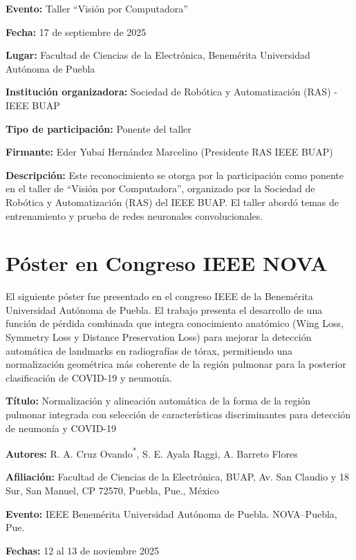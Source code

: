 \textbf{Evento:} Taller ``Visión por Computadora''

\textbf{Fecha:} 17 de septiembre de 2025

\textbf{Lugar:} Facultad de Ciencias de la Electrónica, Benemérita Universidad Autónoma de Puebla

\textbf{Institución organizadora:} Sociedad de Robótica y Automatización (RAS) - IEEE BUAP

\textbf{Tipo de participación:} Ponente del taller

\textbf{Firmante:} Eder Yubaí Hernández Marcelino (Presidente RAS IEEE BUAP)

\textbf{Descripción:} Este reconocimiento se otorga por la participación como ponente en el taller de ``Visión por Computadora'', organizado por la Sociedad de Robótica y Automatización (RAS) del IEEE BUAP. El taller abordó temas de entrenamiento y prueba de redes neuronales convolucionales.



\section{Póster en Congreso IEEE NOVA}

El siguiente póster fue presentado en el congreso IEEE de la Benemérita Universidad Autónoma de Puebla. El trabajo presenta el desarrollo de una función de pérdida combinada que integra conocimiento anatómico (Wing Loss, Symmetry Loss y Distance Preservation Loss) para mejorar la detección automática de landmarks en radiografías de tórax, permitiendo una normalización geométrica más coherente de la región pulmonar para la posterior clasificación de COVID-19 y neumonía.

\textbf{Título:} Normalización y alineación automática de la forma de la región pulmonar integrada con selección de características discriminantes para detección de neumonía y COVID-19

\textbf{Autores:} R. A. Cruz Ovando\textsuperscript{*}, S. E. Ayala Raggi, A. Barreto Flores

\textbf{Afiliación:} Facultad de Ciencias de la Electrónica, BUAP, Av. San Claudio y 18 Sur, San Manuel, CP 72570, Puebla, Pue., México

\textbf{Evento:} IEEE Benemérita Universidad Autónoma de Puebla. NOVA–Puebla, Pue.

\textbf{Fechas:} 12 al 13 de noviembre 2025

